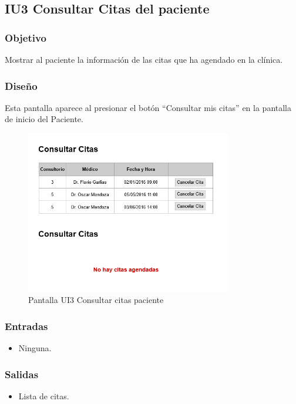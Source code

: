 
\subsection{IU3 Consultar Citas del paciente}

\subsubsection{Objetivo}
Mostrar al paciente la información de las citas que ha agendado en la clínica.

\subsubsection{Diseño}
Esta pantalla aparece al presionar el botón ``Consultar mis citas'' en la pantalla de inicio del Paciente.

\begin{figure}[htbp!]
	\centering
	\includegraphics[width=0.8\textwidth]{images/gui/ui3_consultar_citas_paciente}
	\caption{Pantalla UI3 Consultar citas paciente}
\end{figure}

\subsubsection{Entradas}
\begin{itemize}
	\item Ninguna. 
\end{itemize}

\subsubsection{Salidas}
\begin{itemize}
	\item Lista de citas.
\end{itemize}

